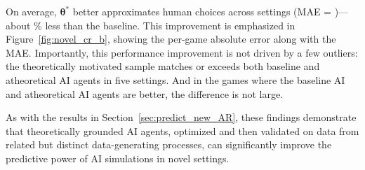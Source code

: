 \documentclass[11pt]{article}
\theoremstyle{definition}
\newcommand{\aisub}{AI agent}
\begin{document}
On average, $\bm{\theta}^*$ better approximates human choices across settings (MAE = \CRTheoryNovelMAE)---about \CRPercImprove\% less than the baseline.
This improvement is emphasized in Figure~\ref{fig:novel_cr_b}, showing the per-game absolute error along with the MAE.
Importantly, this performance improvement is not driven by a few outliers: the theoretically motivated sample matches or exceeds both baseline and atheoretical \aisub{s} in five settings.
And in the games where the baseline AI and atheoretical \aisub{s} are better, the difference is not large.

As with the results in Section~\ref{sec:predict_new_AR}, these findings demonstrate that theoretically grounded \aisub{s}, optimized and then validated on data from related but distinct data-generating processes, can significantly improve the predictive power of AI simulations in novel settings.
\end{document}
